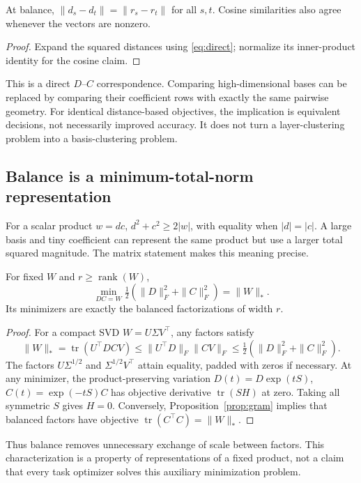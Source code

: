 \begin{proposition}
At balance, $\|d_s-d_t\|=\|r_s-r_t\|$ for all $s,t$. Cosine similarities also agree whenever the vectors are nonzero.
\end{proposition}
\begin{proof}
Expand the squared distances using \eqref{eq:direct}; normalize its inner-product identity for the cosine claim.
\end{proof}
This is a direct $D$--$C$ correspondence. Comparing high-dimensional bases can be replaced by comparing their coefficient rows with exactly the same pairwise geometry. For identical distance-based objectives, the implication is equivalent decisions, not necessarily improved accuracy. It does not turn a layer-clustering problem into a basis-clustering problem.

\subsection{Balance is a minimum-total-norm representation}
For a scalar product $w=dc$, $d^2+c^2\geq2|w|$, with equality when $|d|=|c|$. A large basis and tiny coefficient can represent the same product but use a larger total squared magnitude. The matrix statement makes this meaning precise.

\begin{proposition}
For fixed $W$ and $r\geq\operatorname{rank}(W)$,
\begin{equation}
 \min_{DC=W}\tfrac12(\|D\|_F^2+\|C\|_F^2)=\|W\|_*.
\end{equation}
Its minimizers are exactly the balanced factorizations of width $r$.
\end{proposition}
\begin{proof}
For a compact SVD $W=U\Sigma V^\top$, any factors satisfy
\[
\|W\|_*=\operatorname{tr}(U^\top DCV)
\leq\|U^\top D\|_F\|CV\|_F
\leq\tfrac12(\|D\|_F^2+\|C\|_F^2).
\]
The factors $U\Sigma^{1/2}$ and $\Sigma^{1/2}V^\top$ attain equality, padded with zeros if necessary. At any minimizer, the product-preserving variation $D(t)=D\exp(tS)$, $C(t)=\exp(-tS)C$ has objective derivative $\operatorname{tr}(SH)$ at zero. Taking all symmetric $S$ gives $H=0$. Conversely, Proposition~\ref{prop:gram} implies that balanced factors have objective $\operatorname{tr}(C^\top C)=\|W\|_*$.
\end{proof}
Thus balance removes unnecessary exchange of scale between factors. This characterization is a property of representations of a fixed product, not a claim that every task optimizer solves this auxiliary minimization problem.

